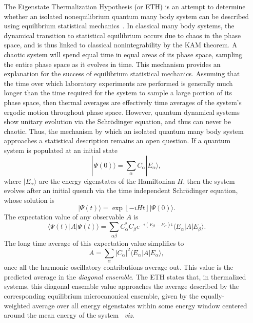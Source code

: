\documentclass[a4paper,10pt]{report}
\begin{document}
The Eigenstate Thermalization Hypothesis (or ETH) is an attempt to determine whether an isolated nonequilibrium
quantum many body system can be described using equilibrium statistical mechanics~\cite{rigol:nature:etc}. In classical many body systems, the dynamical transition to statistical equilibrium occurs due to chaos in the phase space, and is thus linked to classical nonintegrability by the KAM theorem. A chaotic system will spend equal time in equal areas of its phase space, sampling the entire phase space as it evolves in time. This mechanism provides an explanation for the success of equilibrium statistical mechanics. Assuming that the time over which laboratory experiments are performed is generally much longer than the time required for the system to sample a large portion of its phase space, then thermal averages are effectively time averages of the system's ergodic motion throughout phase space. However, quantum dynamical systems show unitary evolution via the Schr\"odinger equation, and thus can never be chaotic. Thus, the mechanism by which an isolated quantum many body system approaches a statistical description remains an open question. If a quantum system is populated at an initial state 
\begin{equation}
|\Psi(0)\rangle = \sum_\alpha C_\alpha |E_\alpha\rangle,
\end{equation}
where $|E_\alpha\rangle$ are the energy eigenstates of the Hamiltonian $H$, then the system evolves after an initial quench via the time independent Schr\"odinger equation, whose solution is
\begin{equation}
 |\Psi(t)\rangle = \exp{\left[-iHt\right]}|\Psi(0)\rangle.
\end{equation}
The expectation value of any observable $A$ is
\begin{equation}
\langle\Psi(t) |A|\Psi(t)\rangle = \sum_{\alpha\beta}C^\ast_\alpha C_\beta e^{-i\left(E_\beta-E_\alpha\right)t} \langle E_\alpha|A|E_\beta\rangle.
\end{equation}
The long time average of this expectation value simplifies to 
\begin{equation}
\bar{A} = \sum_\alpha |C_\alpha|^2 \langle E_\alpha|A|E_\alpha\rangle,
\end{equation}
once all the harmonic oscillatory contributions average out. This value is the predicted average in the \textit{diagonal ensemble}. The ETH states that, in thermalized systems, this diagonal ensemble value approaches the average described by the corresponding equilibrium microcanonical ensemble,  given by the equally-weighted average over all energy eigenstates within some energy window centered around the mean energy of the system~\cite{rigol:nature:etc} \textit{viz.}
\end{document}
